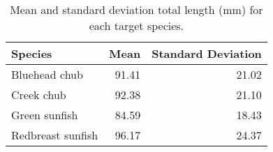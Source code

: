 \begin{table}[ht]
\centering
\caption{Mean and standard deviation total length (mm) for each target species.} 
\label{tab:size}
\begin{tabular}{lrr}
  \hline
Species & Mean & Standard Deviation \\ 
  \hline
Bluehead chub & 91.41 & 21.02 \\ 
  Creek chub & 92.38 & 21.10 \\ 
  Green sunfish & 84.59 & 18.43 \\ 
  Redbreast sunfish & 96.17 & 24.37 \\ 
   \hline
\end{tabular}
\end{table}
